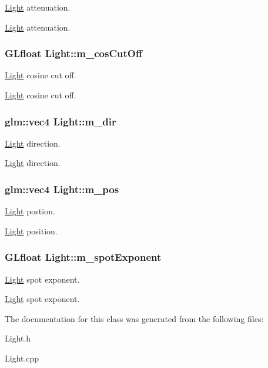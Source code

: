 \hyperlink{class_light}{Light} attenuation. 

\hyperlink{class_light}{Light} attenuation. \hypertarget{class_light_a5f99e10dc1c5c49785c4523d09588eef}{}
\subsubsection[{m\+\_\+cos\+Cut\+Off}]{\setlength{\rightskip}{0pt plus 5cm}G\+Lfloat Light\+::m\+\_\+cos\+Cut\+Off\hspace{0.3cm}{\ttfamily [protected]}}\label{class_light_a5f99e10dc1c5c49785c4523d09588eef}


\hyperlink{class_light}{Light} cosine cut off. 

\hyperlink{class_light}{Light} cosine cut off. \hypertarget{class_light_a837f0e73f495fd9361b6eecaafaef275}{}
\subsubsection[{m\+\_\+dir}]{\setlength{\rightskip}{0pt plus 5cm}glm\+::vec4 Light\+::m\+\_\+dir\hspace{0.3cm}{\ttfamily [protected]}}\label{class_light_a837f0e73f495fd9361b6eecaafaef275}


\hyperlink{class_light}{Light} direction. 

\hyperlink{class_light}{Light} direction. \hypertarget{class_light_a108cbac703d7fc2bc6eb39185d9bead9}{}
\subsubsection[{m\+\_\+pos}]{\setlength{\rightskip}{0pt plus 5cm}glm\+::vec4 Light\+::m\+\_\+pos\hspace{0.3cm}{\ttfamily [protected]}}\label{class_light_a108cbac703d7fc2bc6eb39185d9bead9}


\hyperlink{class_light}{Light} postion. 

\hyperlink{class_light}{Light} position. \hypertarget{class_light_a262000d67538f1a25613e18fe17668cd}{}
\subsubsection[{m\+\_\+spot\+Exponent}]{\setlength{\rightskip}{0pt plus 5cm}G\+Lfloat Light\+::m\+\_\+spot\+Exponent\hspace{0.3cm}{\ttfamily [protected]}}\label{class_light_a262000d67538f1a25613e18fe17668cd}


\hyperlink{class_light}{Light} spot exponent. 

\hyperlink{class_light}{Light} spot exponent. 

The documentation for this class was generated from the following files\+:\begin{DoxyCompactItemize}
\item 
Light.\+h\item 
Light.\+cpp\end{DoxyCompactItemize}
